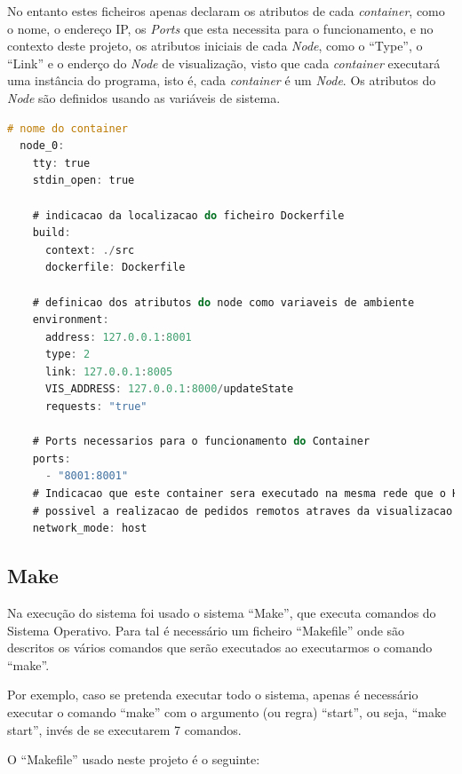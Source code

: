 No entanto estes ficheiros apenas declaram os atributos de cada \emph{container}, como o nome, o endereço \acs{IP}, os \emph{Ports} que esta necessita para o funcionamento, e no contexto deste projeto, os atributos iniciais de cada \emph{Node}, como o ``Type'', o 
``Link'' e o enderço do \emph{Node} de visualização, visto que cada \emph{container} executará uma instância do programa, isto é, cada \emph{container} é um \emph{Node}. Os atributos do \emph{Node} são definidos usando as variáveis de sistema.


\begin{lstlisting}[caption={Ficheiro docker-compose.yml},language=C]
  # nome do container
  node_0:
    tty: true
    stdin_open: true

    # indicacao da localizacao do ficheiro Dockerfile
    build:
      context: ./src
      dockerfile: Dockerfile

    # definicao dos atributos do node como variaveis de ambiente
    environment:
      address: 127.0.0.1:8001
      type: 2 
      link: 127.0.0.1:8005
      VIS_ADDRESS: 127.0.0.1:8000/updateState
      requests: "true"

    # Ports necessarios para o funcionamento do Container
    ports:
      - "8001:8001"
    # Indicacao que este container sera executado na mesma rede que o Host, isto para que seja
    # possivel a realizacao de pedidos remotos atraves da visualizacao
    network_mode: host
\end{lstlisting}


\subsection*{Make}

Na execução do sistema foi usado o sistema ``Make'', que executa comandos do Sistema Operativo. Para tal é necessário um ficheiro ``Makefile'' onde são descritos os vários comandos que serão executados ao executarmos o comando ``make''.

Por exemplo, caso se pretenda executar todo o sistema, apenas é necessário executar o comando ``make'' com o argumento (ou regra) ``start'', ou seja, ``make start'', invés de se executarem 7 comandos.


O ``Makefile'' usado neste projeto é o seguinte:

